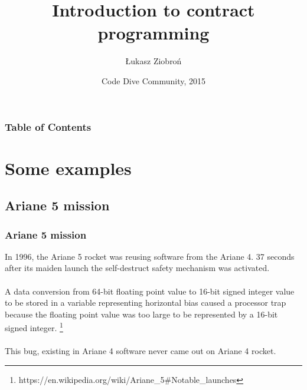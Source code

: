 \documentclass{beamer}
\title[Crisis]{Introduction to contract programming}
\author{Łukasz Ziobroń}
\institute{Nokia}
\date{Code Dive Community, 2015}
\begin{document}
\begin{frame}
\titlepage
\end{frame}

\begin{frame}
\frametitle{Table of Contents}
\begin{multicols}{2}
\tableofcontents
\end{multicols}
\end{frame}

\section{Some examples}
\subsection{Ariane 5 mission}
\begin{frame}
\frametitle{Ariane 5 mission}
{
  In 1996, the Ariane 5 rocket was reusing software from the Ariane 4. 37 seconds after its maiden launch the self-destruct safety mechanism was activated. \\~\\
  A data conversion from 64-bit floating point value to 16-bit signed integer value to be stored in a variable representing horizontal bias caused a processor trap because the floating point value was too large to be represented by a 16-bit signed integer. \footnote{https://en.wikipedia.org/wiki/Ariane\_5\#Notable\_launches} \\~\\
  This bug, existing in Ariane 4 software never came out on Ariane 4 rocket.
}
\end{frame}
\end{document}
